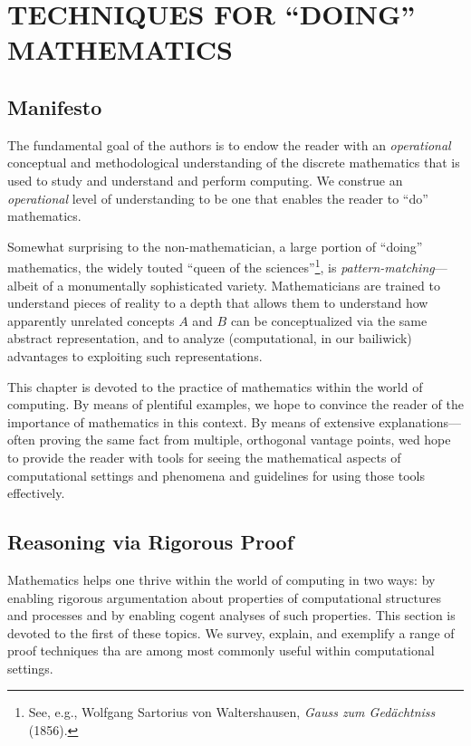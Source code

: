 
\chapter{TECHNIQUES FOR ``DOING'' MATHEMATICS}
\label{ch:doingmath}

\section{Manifesto}
\label{sec:manifesto}

The fundamental goal of the authors is to endow the reader with an
{\em operational} conceptual and methodological understanding of the
discrete mathematics that is used to study and understand and perform
computing.  We construe an {\it operational} level of understanding to
be one that enables the reader to ``do'' mathematics.

Somewhat surprising to the non-mathematician, a large portion of
``doing'' mathematics, the widely touted ``queen of the
sciences''\footnote{See, e.g., Wolfgang Sartorius von Waltershausen,
  {\it Gauss zum Ged\"{a}chtniss} (1856).}, is {\em
  pattern-matching}---albeit of a monumentally sophisticated variety.
Mathematicians are trained to understand pieces of reality to a depth
that allows them to understand how apparently unrelated concepts $A$
and $B$ can be conceptualized via the same abstract representation,
and to analyze (computational, in our bailiwick) advantages to
exploiting such representations.

This chapter is devoted to the practice of mathematics within the
world of computing.  By means of plentiful examples, we hope to
convince the reader of the importance of mathematics in this context.
By means of extensive explanations---often proving the same fact from
multiple, orthogonal vantage points, wed hope to provide the reader
with tools for seeing the mathematical aspects of computational
settings and phenomena and guidelines for using those tools
effectively.

\section{Reasoning via Rigorous Proof}
\label{sec:reasoning-via-proofs}

Mathematics helps one thrive within the world of computing in two
ways: by enabling rigorous argumentation about properties of
computational structures and processes and by enabling cogent analyses
of such properties.  This section is devoted to the first of these
topics.  We survey, explain, and exemplify a range of proof techniques
tha are among most commonly useful within computational settings.


